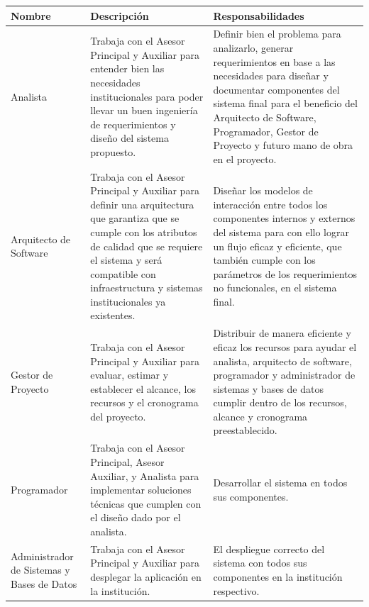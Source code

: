 \begin{longtable}{|p{}|p{}|p{}|}
  \hline
  \textbf{Nombre} & \textbf{Descripción} & \textbf{Responsabilidades} \\
  \hline
  \endhead
  Analista & Trabaja con el Asesor Principal y Auxiliar para entender bien las necesidades institucionales para poder llevar un buen ingeniería de requerimientos y diseño del sistema propuesto. & Definir bien el problema para analizarlo, generar requerimientos en base a las necesidades para diseñar y documentar componentes del sistema final para el beneficio del Arquitecto de Software, Programador, Gestor de Proyecto y futuro mano de obra en el proyecto. \\
  \hline
  Arquitecto de Software & Trabaja con el Asesor Principal y Auxiliar para definir una arquitectura que garantiza que se cumple con los atributos de calidad que se requiere el sistema y será compatible con infraestructura y sistemas institucionales ya existentes. & Diseñar los modelos de interacción entre todos los componentes internos y externos del sistema para con ello lograr un flujo eficaz y eficiente, que también cumple con los parámetros de los requerimientos no funcionales, en el sistema final. \\
  \hline
  Gestor de Proyecto & Trabaja con el Asesor Principal y Auxiliar para evaluar, estimar y establecer el alcance, los recursos y el cronograma del proyecto. & Distribuir de manera eficiente y eficaz los recursos para ayudar el analista, arquitecto de software, programador y administrador de sistemas y bases de datos cumplir dentro de los recursos, alcance y cronograma preestablecido. \\
  \hline
  Programador & Trabaja con el Asesor Principal, Asesor Auxiliar, y Analista para implementar soluciones técnicas que cumplen con el diseño dado por el analista. & Desarrollar el sistema en todos sus componentes. \\
  \hline
  Administrador de Sistemas y Bases de Datos & Trabaja con el Asesor Principal y Auxiliar para desplegar la aplicación en la institución. & El despliegue correcto del sistema con todos sus componentes en la institución respectivo. \\

\end{longtable}
